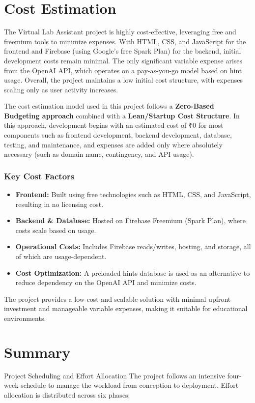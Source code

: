 \newline
\section{Cost Estimation}


The Virtual Lab Assistant project is highly cost-effective, leveraging free and freemium tools to minimize expenses. With HTML, CSS, and JavaScript for the frontend and Firebase (using Google’s free Spark Plan) for the backend, initial development costs remain minimal. The only significant variable expense arises from the OpenAI API, which operates on a pay-as-you-go model based on hint usage. Overall, the project maintains a low initial cost structure, with expenses scaling only as user activity increases.

The cost estimation model used in this project follows a \textbf{Zero-Based Budgeting approach} combined with a \textbf{Lean/Startup Cost Structure}. In this approach, development begins with an estimated cost of ₹0 for most components such as frontend development, backend development, database, testing, and maintenance, and expenses are added only where absolutely necessary (such as domain name, contingency, and API usage).

\subsubsection{Key Cost Factors}

\begin{itemize}

\item \textbf{Frontend:} Built using free technologies such as HTML, CSS, and JavaScript, resulting in no licensing cost.

\item \textbf{Backend \& Database:} Hosted on Firebase Freemium (Spark Plan), where costs scale based on usage.


\item \textbf{Operational Costs:} Includes Firebase reads/writes, hosting, and storage, all of which are usage-dependent.

\item \textbf{Cost Optimization:} A preloaded hints database is used as an alternative to reduce dependency on the OpenAI API and minimize costs.

\end{itemize}

The project provides a low-cost and scalable solution with minimal upfront investment and manageable variable expenses, making it suitable for educational environments.

\newline


\section{Summary}
Project Scheduling and Effort Allocation
The project follows an intensive four-week schedule to manage the workload from conception
to deployment. Effort allocation is distributed across six phases: 



